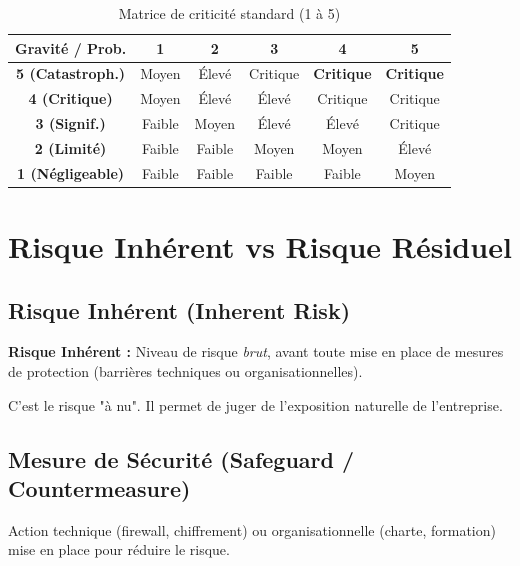 \begin{table}[htbp]
\centering
\begin{tabular}{|c|c|c|c|c|c|}
\hline
\textbf{Gravité / Prob.} & \textbf{1} & \textbf{2} & \textbf{3} & \textbf{4} & \textbf{5} \\ \hline
\textbf{5 (Catastroph.)} & Moyen & Élevé & Critique & \cellcolor{red!50}\textbf{Critique} & \cellcolor{red!50}\textbf{Critique} \\ \hline
\textbf{4 (Critique)} & Moyen & Élevé & Élevé & Critique & Critique \\ \hline
\textbf{3 (Signif.)} & Faible & Moyen & Élevé & Élevé & Critique \\ \hline
\textbf{2 (Limité)} & Faible & Faible & Moyen & Moyen & Élevé \\ \hline
\textbf{1 (Négligeable)} & Faible & Faible & Faible & Faible & Moyen \\ \hline
\end{tabular}
\caption{Matrice de criticité standard (1 à 5)}
\end{table}

\section{Risque Inhérent vs Risque Résiduel}

\subsection{Risque Inhérent (Inherent Risk)}

\begin{boxdef}
\textbf{Risque Inhérent :} Niveau de risque \textit{brut}, avant toute mise en place de mesures de protection (barrières techniques ou organisationnelles).
\end{boxdef}

C'est le risque "à nu". Il permet de juger de l'exposition naturelle de l'entreprise.

\subsection{Mesure de Sécurité (Safeguard / Countermeasure)}

Action technique (firewall, chiffrement) ou organisationnelle (charte, formation) mise en place pour réduire le risque.

